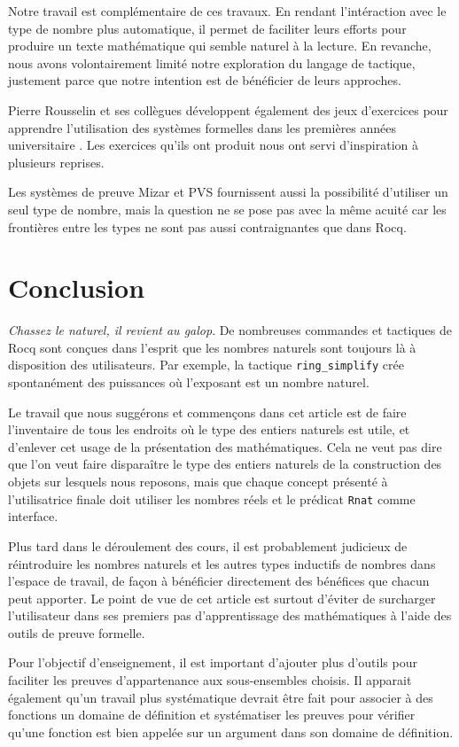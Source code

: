 \documentclass{jflart}
\begin{document}
Notre travail est complémentaire de ces travaux.  En rendant
l'intéraction avec le type de nombre plus automatique, il permet de
faciliter leurs efforts pour produire un texte mathématique qui semble
naturel à la lecture.  En revanche, nous avons volontairement limité
notre exploration du langage de tactique, justement parce que notre
intention est de bénéficier de leurs approches.

Pierre Rousselin et ses collègues développent
également des jeux d'exercices pour apprendre l'utilisation des
systèmes formelles dans les premières années universitaire
\cite{RousselinPF24}.  Les
exercices qu'ils ont produit nous ont servi d'inspiration à plusieurs
reprises.

Les systèmes de preuve Mizar \cite{Mizar-beyond2015} et PVS
\cite{PVS11} fournissent aussi
la possibilité d'utiliser un seul type de nombre, mais la question ne
se pose pas avec la même acuité car les frontières entre les types ne
sont pas aussi contraignantes que dans Rocq.

\section{Conclusion}
{\em Chassez le naturel, il revient au galop}.  De nombreuses commandes
et tactiques de Rocq sont conçues dans l'esprit que les nombres naturels
sont toujours là à disposition des utilisateurs.  Par exemple, la tactique
\texttt{ring\_simplify} crée spontanément des puissances où l'exposant est un
nombre naturel.

Le travail que nous suggérons et commençons dans cet article est de
faire l'inventaire de tous les endroits où le type des entiers
naturels est utile, et d'enlever cet usage de la présentation des
mathématiques.  Cela ne veut pas dire
que l'on veut faire disparaître le type des entiers naturels de la
construction des objets sur lesquels nous reposons, mais que chaque
concept présenté à l'utilisatrice finale doit utiliser les nombres
réels et le prédicat \texttt{Rnat} comme interface.

Plus tard dans le déroulement des cours, il est probablement
judicieux de réintroduire les
nombres naturels et les autres types inductifs de nombres dans
l'espace de travail, de façon à bénéficier directement des bénéfices
que chacun peut apporter.  Le point de vue de cet article est surtout
d'éviter de surcharger l'utilisateur dans ses premiers pas
d'apprentissage des mathématiques à l'aide des outils de preuve
formelle.

Pour l'objectif d'enseignement, il est important d'ajouter
plus d'outils pour faciliter les preuves d'appartenance aux
sous-ensembles choisis.  Il apparait également qu'un travail plus
systématique devrait être fait pour associer à des fonctions un
domaine de définition et systématiser les preuves pour vérifier qu'une
fonction est bien appelée sur un argument dans son domaine de
définition.



\end{document}
